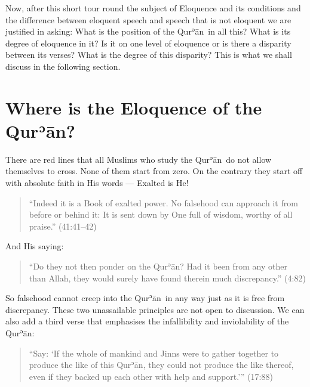 \documentclass[12pt]{memoir}
\def\´{ʾ} %
\newcommand{\ar}[1]{\RL{\arabicfont#1}}
\def \Quran{Qur\-\´ān} %
\def\pardivider{\centerline{\ar{۞۞۞}}} %
\newcommand{\QRef}[1]{{\color{darkblue}#1}}
\begin{document}
\pardivider

Now, after this short tour round the subject of Eloquence and its conditions
and the difference between eloquent speech and speech
that is not eloquent we are justified in asking:
What is the position of the \Quran\ in all this?
What is its degree of eloquence in it?
Is it on one level of eloquence or is there a disparity between its verses?
What is the degree of this disparity?
This is what we shall discuss in the following section.

\section{Where is the Eloquence of the \Quran?}

There are red lines that all Muslims who study the \Quran\
do not allow themselves to cross.
None of them start from zero.
On the contrary they start off with absolute faith in His words —
Exalted is He!

\begin{quote}
“Indeed it is a Book of exalted power.
No falsehood can approach it from before or behind it:
It is sent down by One full of wisdom, worthy of all praise.”
(\QRef{41:41–42})
\end{quote}

And His saying:

\begin{quote}
“Do they not then ponder on the \Quran?
Had it been from any other than Allah,
they would surely have found therein much discrepancy.” (\QRef{4:82})
\end{quote}

So falsehood cannot creep into the \Quran\ in any way
just as it is free from discrepancy.
These two unassailable principles are not open to discussion.
We can also add a third verse that emphasises the infallibility
and inviolability of the \Quran:

\begin{quote}
“Say: ‘If the whole of mankind and Jinns were to gather together
to produce the like of this \Quran, they could not produce the like thereof,
even if they backed up each other with help and support.’” (\QRef{17:88})
\end{quote}
\end{document}
